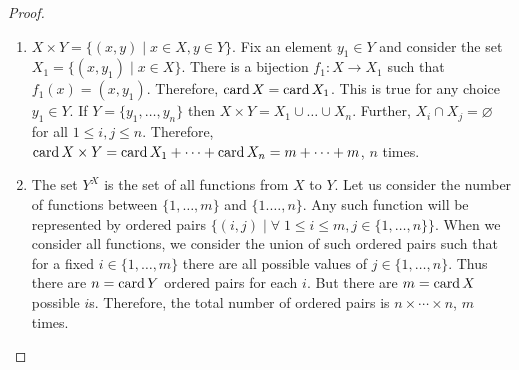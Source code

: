 \begin{proof}
\begin{enumerate}
\item $X \times Y = \{(x, y) \;|\; x \in X, y \in Y\}$. Fix an element 
$y_1 \in Y$ and consider the set $X_1 = \{(x, y_1) \;|\; x \in X\}$. There 
is a bijection $f_1: X \rightarrow X_1$ such that $f_1(x) = (x, y_1)$.
Therefore, $\operatorname{card} X = \operatorname{card} X_1$. This is true for any choice $y_1 \in Y$.
If $Y = \{y_1, \ldots, y_n\}$ then $X \times Y = X_1 \cup \ldots \cup X_n$.
Further, $X_i \cap X_j = \varnothing$ for all $1 \le i, j \le n$. 
Therefore, $\operatorname{card} X \times Y = \operatorname{card} X_1 + \cdots + \operatorname{card} X_n = m + \cdots
+ m$, $n$ times. 

\item The set $Y^X$ is the set of all functions from $X$ to $Y$. Let us 
consider the number of functions between $\{1, \ldots, m\}$ and $\{1. 
\ldots, n\}$. Any such function will be represented by ordered pairs 
$\{(i, j) \;|\; \forall\; 1 \le i \le m, j \in \{1, \ldots, n\}\}$. When
we consider all functions, we consider the union of such ordered pairs 
such that for a fixed $i \in \{1, \ldots, m\}$ there are all possible
values of $j \in \{1, \ldots, n\}$. Thus there are $n = \operatorname{card} Y$ ordered
pairs for each $i$. But there are $m = \operatorname{card} X$ possible $i$s. Therefore,
the total number of ordered pairs is $n \times \cdots \times n$, $m$
times.
\end{enumerate}
\end{proof}
